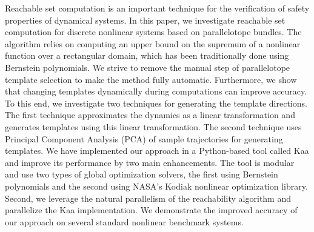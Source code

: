Reachable set computation is an important technique for the verification of safety properties of dynamical systems.
%
%
In this paper, we investigate reachable set computation for discrete nonlinear systems based on parallelotope bundles.
%
The algorithm relies on computing an upper bound on the supremum of a nonlinear function over a rectangular domain, which has been traditionally done using Bernstein polynomials.
 We strive to remove the manual step of parallelotope template selection to make the method fully automatic.
%
Furthermore, we show that changing templates dynamically during computations can improve accuracy.
%
%
%
To this end, we investigate two techniques for generating the template directions.
%
The first technique approximates the dynamics as a linear transformation and generates templates using this linear transformation.
%
The second technique uses Principal Component Analysis (PCA) of sample trajectories for generating templates.
%
We have implemented our approach in a Python-based tool called Kaa and improve its performance by two main enhancements.
%
%
The tool is modular and use two types of global optimization solvers, the first using Bernstein polynomials and the second using NASA's Kodiak nonlinear optimization library.
%
Second, we leverage the natural parallelism of the reachability algorithm and parallelize the Kaa implementation.
%
We demonstrate the improved accuracy of our approach on several standard nonlinear benchmark systems.
